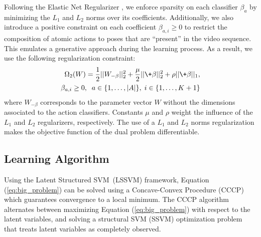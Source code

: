 Following the Elastic Net Regularizer \cite{zou2005regularization}, we enforce sparsity on each 
classifier $\beta_a$ by minimizing the $L_1$ and $L_2$ norms over its 
coefficients. Additionally, we also introduce a positive constraint on each coefficient 
$\beta_{a,i} \ge 0$ to restrict
the composition of atomic actions to poses that are ``present'' in the 
video sequence. This emulates a generative approach during the learning process. As a result, we use 
the following 
regularization constraint:
\begin{equation}
\label{eq:general_regularizer}
\begin{split}
\Omega_2(W ) = \frac{1}{2}||W_{-\beta}||_2^2 + \frac{\mu}{2}||\+\beta||_2^2 + \rho ||\+\beta||_1, \\
\beta_{a,i} \ge 0, \;\; a\in\{1,\dots,|A|\}, \;   i\in\{1,\dots,K+1\}
\end{split}
\end{equation}
where $W_{-\beta}$ corresponds to the parameter vector $W$ without the dimensions associated to 
the 
action classifiers. Constants $\mu$ and $\rho$ weight the influence of the $L_1$ and $L_2$ 
regularizers, respectively. The use of a $L_1$ and $L_2$ norms regularization makes the objective 
function of the dual problem differentiable.


\subsection{Learning Algorithm}

Using the Latent Structured \mbox{SVM (LSSVM)} framework, Equation (\ref{eq:big_problem}) can be 
solved using a
Concave-Convex Procedure (CCCP) \cite{Yuille:Rangarajan:03} which guarantees
convergence to a local minimum. The CCCP algorithm alternates between
maximizing Equation (\ref{eq:big_problem}) with respect to the latent variables,
and solving a structural SVM (SSVM) optimization problem \cite{Tsochantaridis2004} that treats latent variables as completely observed.

